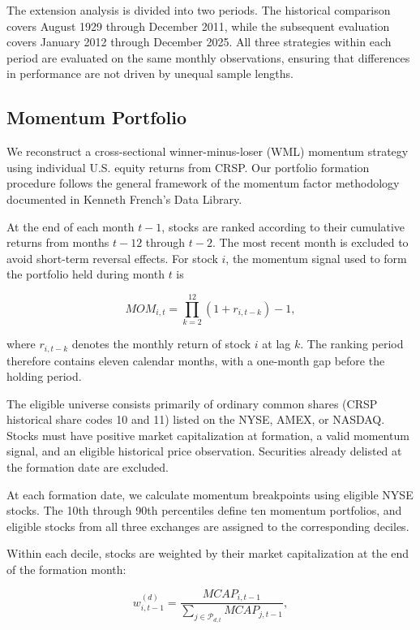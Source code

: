 \documentclass[11pt]{article}
\begin{document}
The extension analysis is divided into two periods.
The historical comparison covers August 1929 through
December 2011, while the subsequent evaluation covers
January 2012 through December 2025. All three strategies
within each period are evaluated on the same monthly
observations, ensuring that differences in performance
are not driven by unequal sample lengths.



\subsection{Momentum Portfolio}
\label{subsec:momentum}

We reconstruct a cross-sectional winner-minus-loser (WML)
momentum strategy using individual U.S. equity returns from CRSP.
Our portfolio formation procedure follows the general framework
of the momentum factor methodology documented in Kenneth
French's Data Library.

At the end of each month $t-1$, stocks are ranked according
to their cumulative returns from months $t-12$ through $t-2$.
The most recent month is excluded to avoid short-term reversal
effects. For stock $i$, the momentum signal used to form the
portfolio held during month $t$ is

\begin{equation}
MOM_{i,t}
=
\prod_{k=2}^{12}(1+r_{i,t-k})-1,
\end{equation}

where $r_{i,t-k}$ denotes the monthly return of stock $i$
at lag $k$. The ranking period therefore contains eleven
calendar months, with a one-month gap before the holding period.

The eligible universe consists primarily of ordinary common
shares (CRSP historical share codes 10 and 11) listed on
the NYSE, AMEX, or NASDAQ. Stocks must have positive
market capitalization at formation, a valid momentum signal,
and an eligible historical price observation. Securities
already delisted at the formation date are excluded.

At each formation date, we calculate momentum breakpoints
using eligible NYSE stocks. The 10th through 90th percentiles
define ten momentum portfolios, and eligible stocks from
all three exchanges are assigned to the corresponding deciles.

Within each decile, stocks are weighted by their market
capitalization at the end of the formation month:

\begin{equation}
w_{i,t-1}^{(d)}
=
\frac{MCAP_{i,t-1}}
{\sum_{j \in \mathcal{P}_{d,t}} MCAP_{j,t-1}},
\end{equation}
\end{document}
